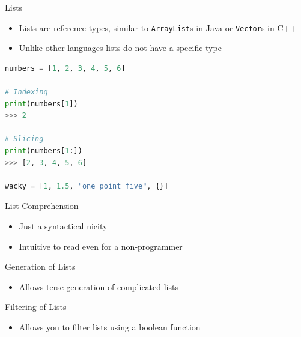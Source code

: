 \documentclass[aspectratio=169,xcolor=dvipsnames]{beamer}
\begin{document}
\begin{frame}[fragile]{Lists}
  \begin{itemize}
    \item Lists are reference types, similar to \texttt{ArrayList}s in Java or \texttt{Vector}s in C++
    \item Unlike other languages lists do not have a specific type
  \end{itemize}
  \begin{example}
    \begin{lstlisting}[language=Python]
numbers = [1, 2, 3, 4, 5, 6]

# Indexing
print(numbers[1])
>>> 2

# Slicing
print(numbers[1:])
>>> [2, 3, 4, 5, 6]

wacky = [1, 1.5, "one point five", {}]
    \end{lstlisting}
  \end{example}
\end{frame}


\begin{frame}{List Comprehension}
  \begin{itemize}
    \item Just a syntactical nicity
    \item Intuitive to read even for a non-programmer
    \begin{example}
      
    \end{example}
  \end{itemize}
\end{frame}


\begin{frame}{Generation of Lists}
  \begin{itemize}
    \item Allows terse generation of complicated lists
    \begin{example}
      
    \end{example}
  \end{itemize}
\end{frame}


\begin{frame}{Filtering of Lists}
  \begin{itemize}
    \item Allows you to filter lists using a boolean function
    \begin{example}
      
    \end{example}
  \end{itemize}
\end{frame}
\end{document}
